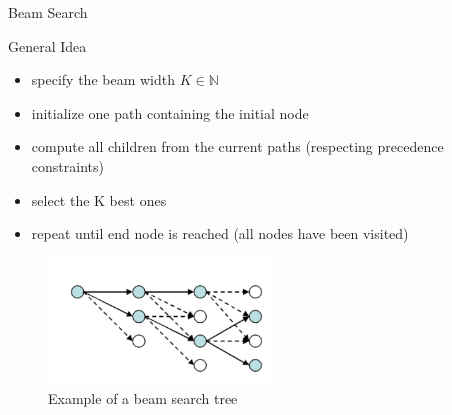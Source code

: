 \documentclass{beamer}
\begin{document}
\begin{frame}{Beam Search}

	\begin{block}{General Idea}

		\begin{itemize}

			\item specify the beam width $K\in\mathbb{N}$
			\item initialize one path containing the initial node
			\item compute all children from the current paths (respecting precedence constraints)
			\item select the K best ones
			\item repeat until end node is reached (all nodes have been visited)

		\end{itemize}

	\end{block}

\end{frame}

\begin{frame}

	\begin{figure}[htp]
		\centering
		\includegraphics[width=6cm]{images/beam_search.png}
		\caption{Example of a beam search tree \cite{Beam:1}}
	\end{figure}

\end{frame}
\end{document}
